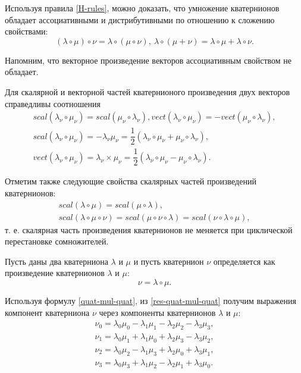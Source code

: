 \documentclass[14pt]{extreport}
\begin{document}
Используя правила \eqref{H-rules}, можно доказать, что умножение кватернионов обладает ассоциативными и дистрибутивными по отношению к сложению свойствами:
\begin{equation}
(\lambda \circ \mu) \circ \nu = \lambda \circ ( \mu \circ \nu),\ \lambda \circ (\mu + \nu) = \lambda \circ  \mu + \lambda \circ \nu.
\end{equation}

Напомним, что векторное произведение векторов ассоциативным свойством не обладает.

Для скалярной и векторной частей кватернионого произведения двух векторов справедливы соотношения
\begin{equation}
\begin{split}
scal(\lambda_{\nu} \circ \mu_{\nu}) = scal(\mu_{\nu} \circ \lambda_{\nu}), vect(\lambda_{\nu} \circ \mu_{\nu}) = -vect(\mu_{\nu} \circ \lambda_{\nu}),\\
scal(\lambda_{\nu} \circ \mu_{\nu}) = -\lambda_{\nu} \mu_{\nu} = \dfrac{1}{2}(\lambda_{\nu} \circ \mu_{\nu}+ \mu_{\nu} \circ \lambda_{\nu}),\\
vect(\lambda_{\nu} \circ \mu_{\nu}) = \lambda_{\nu} \times \mu_{\nu} = \dfrac{1}{2}(\lambda_{\nu} \circ \mu_{\nu}- \mu_{\nu} \circ \lambda_{\nu}).
\end{split}
\end{equation}

Отметим также следующие свойства скалярных частей произведений кватернионов:
\begin{equation}
\begin{split}
scal(\lambda \circ \mu) = scal(\mu \circ \lambda),\\
scal(\lambda \circ \mu \circ \nu) = scal(\mu \circ \nu \circ \lambda) = scal(\nu \circ \lambda \circ \mu),
\end{split}
\end{equation}
т. е. скалярная часть произведения кватернионов не меняется при циклической перестановке сомножителей.

Пусть даны два кватерниона $\lambda$ и $\mu$ и пусть кватернион $\nu$ определяется как произведение кватернионов $\lambda$ и $\mu$:
\begin{equation}
\label{res-quat-mul-quat}
\nu = \lambda \circ \mu.
\end{equation}

Используя формулу \eqref{quat-mul-quat}, из \eqref{res-quat-mul-quat} получим выражения компонент кватерниона $\nu$ через компоненты кватернионов $\lambda$ и $\mu$:
\begin{equation}
\label{nu-lambda-mu}
\begin{split}
\nu_{0}=\lambda_{0}\mu_{0}-\lambda_{1}\mu_{1}-\lambda_{2}\mu_{2}-\lambda_{3}\mu_{3},\\
\nu_{1}=\lambda_{0}\mu_{1}+\lambda_{1}\mu_{0}+\lambda_{2}\mu_{3}-\lambda_{3}\mu_{2},\\
\nu_{2}=\lambda_{0}\mu_{2}-\lambda_{1}\mu_{3}+\lambda_{2}\mu_{0}+\lambda_{3}\mu_{1},\\
\nu_{3}=\lambda_{0}\mu_{3}+\lambda_{1}\mu_{2}-\lambda_{2}\mu_{1}+\lambda_{3}\mu_{0}.
\end{split}
\end{equation}
\end{document}
